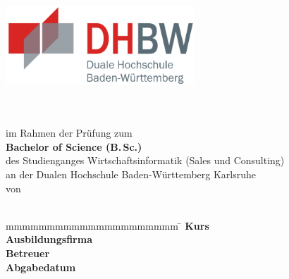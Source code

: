 \thispagestyle{plain}

\begin{titlepage}
	
	\centering\includegraphics[height=3cm]{Abbildungen/dhbw}	
	\enlargethispage{20mm}
	
	\begin{center}
		\vspace*{12mm}	{\LARGE\bf \titel }\\
		\vspace*{12mm}	{\large\bf \art}\\
		\vspace*{12mm}	im Rahmen der Prüfung zum\\
		\vspace*{3mm} 	\textbf{Bachelor of Science (B.\,Sc.)}\\
		\vspace*{12mm}	des Studienganges Wirtschaftsinformatik (Sales und Consulting)\\
		\vspace*{3mm} 	an der Dualen Hochschule Baden-Württemberg Karlsruhe\\
		\vspace*{12mm}	von\\
		\vspace*{3mm} 	{\large\bf \verfasser}\\
		
	\end{center}
	\vfill
	\begin{spacing}{1.7}
		\begin{center}\parbox{0cm}{
				\begin{tabbing}
					mmmmmmmmmmmmmmmmmmmmm \=  \kill
					\textbf{Kurs}  				   \>  \kurs\\
					\textbf{Ausbildungsfirma}      \>  \ausbildungsbetrieb\\
					\textbf{Betreuer}              \>  \betreuer\\
					\textbf{Abgabedatum}		   \> \underline{\hspace{3.5cm}}
					
				\end{tabbing}
			}
		\end{center}
	\end{spacing}
	\vfill
\end{titlepage}